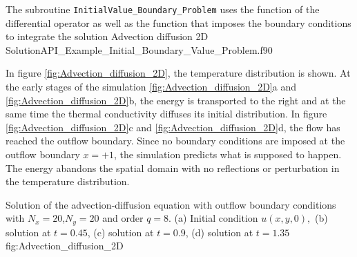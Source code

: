      
 The subroutine \verb|InitialValue_Boundary_Problem| uses the function of the differential operator as well as the function that imposes the boundary conditions to integrate the solution    
        \vspace{0.5cm} 
        {Advection diffusion 2D}
        {Solution}{API_Example_Initial_Boundary_Value_Problem.f90}
        
   
 In figure \ref{fig:Advection_diffusion_2D}, the temperature distribution is shown. At the early stages of the simulation \ref{fig:Advection_diffusion_2D}a and \ref{fig:Advection_diffusion_2D}b, the energy is transported to the right and at the same time the thermal conductivity diffuses its initial distribution. In figure \ref{fig:Advection_diffusion_2D}c and \ref{fig:Advection_diffusion_2D}d,  the flow has reached the outflow boundary. Since no boundary conditions are imposed at the outflow boundary $ x=+1$, the simulation predicts what is supposed to happen. The energy abandons the spatial domain with no reflections or perturbation in the temperature distribution.   
      
\fourgraphs
{}
{}
{}
{}
{Solution of the advection-diffusion equation with outflow boundary conditions  with $ N_x =20$,$ N_y =20$  and order $q=8$. (a) Initial condition $u(x,y,0),$ (b) solution at $ t =0.45$, (c) solution at  $t=0.9$, (d) solution at $t=1.35$}{fig:Advection_diffusion_2D}
         
   

\newpage       
